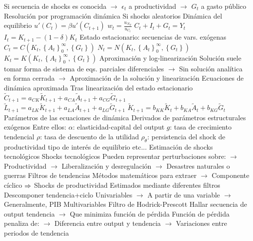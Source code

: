 \documentclass{nuevotema}
\begin{document}
\begin{esquemal}
				\4[] Si secuencia de shocks es conocida
				\4[] $\to$ $\epsilon_t$ a productividad
				\4[] $\to$ $G_t$ a gasto público
				\4 Resolución por programación dinámica
				\4[] Si shocks aleatorios
			\3 Dinámica del equilibrio
				\4[] $u'(C_t) = \beta u'(C_{t+1})$
				\4[] $w_t = \frac{u_{N_T}}{u_{C_t}}$
				\4[] $C_t + I_t + G_t = Y_t$
				\4[] $I_t = K_{t+1} - (1-\delta) K_t$
				\4[$\then$] Estado estacionario: secuencias de vars. exógenas
				\4[] $C_t = C(K_t, \left\lbrace A_t \right\rbrace^\infty_0, \left\lbrace G_t \right\rbrace )$
				\4[] $N_t = N(K_t, \left\lbrace A_t \right\rbrace^\infty_0, \left\lbrace G_t \right\rbrace )$
				\4[] $K_t = K (K_t, \left\lbrace A_t \right\rbrace^\infty_0, \left\lbrace G_t \right\rbrace )$
				\4 Aproximación y log-linearización
				\4[] Solución suele tomar forma de
				\4[] sistema de eqs. parciales diferenciales
				\4[] $\to$ Sin solución analítica en forma cerrada
				\4[] $\to$ Aproximación de la solución y linearización
				\4 Ecuaciones de dinámica aproximada
				\4[] Tras linearización del estado estacionario
				\4[] $\tilde{C}_{t+1} = a_{CK}\tilde{K}_{t+1} + a_{CA}\tilde{A}_{t+1} + a_{CG} \tilde{G}_{t+1}$
				\4[] $\tilde{L}_{t+1} = a_{LK}\tilde{K}_{t+1} + a_{LA}\tilde{A}_{t+1} + a_{LG} \tilde{G}_{t+1}$
				\4[] $\tilde{K}_{t+1} = b_{KK}\tilde{K}_{t} + b_{KA}\tilde{A}_{t} + b_{KG} \tilde{G}_{t}$
				\4 Parámetros de las ecuaciones de dinámica
				\4[] Derivados de parámetros estructurales exógenos
				\4[] Entre ellos:
				\4[] $\alpha$: elasticidad-capital del output
				\4[] $g$: tasa de crecimiento tendencial
				\4[] $\rho$: tasa de descuento de la utilidad
				\4[] $\rho_\theta$: persistencia del shock de productividad
				\4[] tipo de interés de equilibrio
				\4[] etc...
			\3 Estimación de shocks tecnológicos
				\4 Shocks tecnológicos
				\4[] Pueden representar perturbaciones sobre:
				\4[] $\to$  Productividad
				\4[] $\to$ Liberalización y desregulación
				\4[] $\to$ Desastres naturales o guerras
				\4 Filtros de tendencias
				\4[] Métodos matemáticos para extraer
				\4[] $\to$ Componente cíclico
				\4[] $\then$ Shocks de productividad
				\4 Estimados mediante diferentes filtros
				\4[] Descomponer tendencia+ciclo
				\4[] Univariables
				\4[] $\to$ A partir de una variable
				\4[] $\to$ Generalmente, PIB
				\4[] Multivariables
				\4 Filtro de Hodrick-Prescott
				\4[] Hallar secuencia de output tendencia
				\4[] $\to$ Que minimiza función de pérdida
				\4[] Función de pérdida penaliza de:
				\4[] $\to$ Diferencia entre output y tendencia
				\4[] $\to$ Variaciones entre periodos de tendencia

\end{esquemal}
\end{document}
